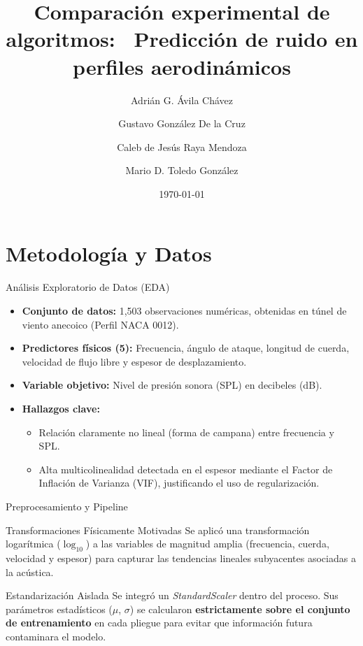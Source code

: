 \documentclass[aspectratio=169]{beamer}
\title[Ruido en Perfiles Aerodinámicos]{Comparación experimental de algoritmos: \ Predicción de ruido en perfiles aerodinámicos}
\author[Ávila, González, Raya, Toledo]{Adrián G. Ávila Chávez \and Gustavo González De la Cruz \and Caleb de Jesús Raya Mendoza \and Mario D. Toledo González}
\institute[UGto]{Universidad de Guanajuato \ División de Ingenierías}
\date{\today}
\begin{document}
\begin{frame}
\titlepage
\end{frame}

\section{Metodología y Datos}

\begin{frame}{Análisis Exploratorio de Datos (EDA)}
\begin{itemize}
\item \textbf{Conjunto de datos:} 1,503 observaciones numéricas, obtenidas en túnel de viento anecoico (Perfil NACA 0012).
\item \textbf{Predictores físicos (5):} Frecuencia, ángulo de ataque, longitud de cuerda, velocidad de flujo libre y espesor de desplazamiento.
\item \textbf{Variable objetivo:} Nivel de presión sonora (SPL) en decibeles (dB).
\vspace{0.3cm}
\item \textbf{Hallazgos clave:}
\begin{itemize}
\item Relación claramente no lineal (forma de campana) entre frecuencia y SPL.
\item Alta multicolinealidad detectada en el espesor mediante el Factor de Inflación de Varianza (VIF), justificando el uso de regularización.
\end{itemize}
\end{itemize}
\end{frame}

\begin{frame}{Preprocesamiento y Pipeline}
\begin{block}{Transformaciones Físicamente Motivadas}
Se aplicó una transformación logarítmica ($\log_{10}$) a las variables de magnitud amplia (frecuencia, cuerda, velocidad y espesor) para capturar las tendencias lineales subyacentes asociadas a la acústica.
\end{block}

\vspace{0.3cm}

\begin{block}{Estandarización Aislada}
    Se integró un \textit{StandardScaler} dentro del proceso. Sus parámetros estadísticos ($\mu$, $\sigma$) se calcularon \textbf{estrictamente sobre el conjunto de entrenamiento} en cada pliegue para evitar que información futura contaminara el modelo.
\end{block}


\end{frame}
\end{document}
